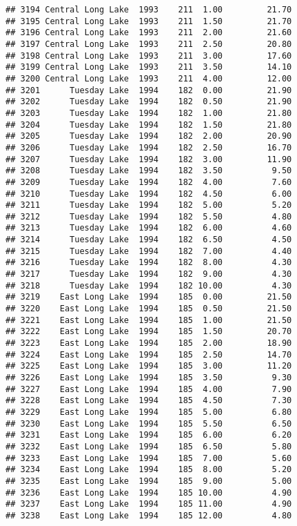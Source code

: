\documentclass[
]{article}
\begin{document}
\begin{verbatim}
## 3194 Central Long Lake  1993    211  1.00         21.70
## 3195 Central Long Lake  1993    211  1.50         21.70
## 3196 Central Long Lake  1993    211  2.00         21.60
## 3197 Central Long Lake  1993    211  2.50         20.80
## 3198 Central Long Lake  1993    211  3.00         17.60
## 3199 Central Long Lake  1993    211  3.50         14.10
## 3200 Central Long Lake  1993    211  4.00         12.00
## 3201      Tuesday Lake  1994    182  0.00         21.90
## 3202      Tuesday Lake  1994    182  0.50         21.90
## 3203      Tuesday Lake  1994    182  1.00         21.80
## 3204      Tuesday Lake  1994    182  1.50         21.80
## 3205      Tuesday Lake  1994    182  2.00         20.90
## 3206      Tuesday Lake  1994    182  2.50         16.70
## 3207      Tuesday Lake  1994    182  3.00         11.90
## 3208      Tuesday Lake  1994    182  3.50          9.50
## 3209      Tuesday Lake  1994    182  4.00          7.60
## 3210      Tuesday Lake  1994    182  4.50          6.00
## 3211      Tuesday Lake  1994    182  5.00          5.20
## 3212      Tuesday Lake  1994    182  5.50          4.80
## 3213      Tuesday Lake  1994    182  6.00          4.60
## 3214      Tuesday Lake  1994    182  6.50          4.50
## 3215      Tuesday Lake  1994    182  7.00          4.40
## 3216      Tuesday Lake  1994    182  8.00          4.30
## 3217      Tuesday Lake  1994    182  9.00          4.30
## 3218      Tuesday Lake  1994    182 10.00          4.30
## 3219    East Long Lake  1994    185  0.00         21.50
## 3220    East Long Lake  1994    185  0.50         21.50
## 3221    East Long Lake  1994    185  1.00         21.50
## 3222    East Long Lake  1994    185  1.50         20.70
## 3223    East Long Lake  1994    185  2.00         18.90
## 3224    East Long Lake  1994    185  2.50         14.70
## 3225    East Long Lake  1994    185  3.00         11.20
## 3226    East Long Lake  1994    185  3.50          9.30
## 3227    East Long Lake  1994    185  4.00          7.90
## 3228    East Long Lake  1994    185  4.50          7.30
## 3229    East Long Lake  1994    185  5.00          6.80
## 3230    East Long Lake  1994    185  5.50          6.50
## 3231    East Long Lake  1994    185  6.00          6.20
## 3232    East Long Lake  1994    185  6.50          5.80
## 3233    East Long Lake  1994    185  7.00          5.60
## 3234    East Long Lake  1994    185  8.00          5.20
## 3235    East Long Lake  1994    185  9.00          5.00
## 3236    East Long Lake  1994    185 10.00          4.90
## 3237    East Long Lake  1994    185 11.00          4.90
## 3238    East Long Lake  1994    185 12.00          4.80

\end{verbatim}
\end{document}
